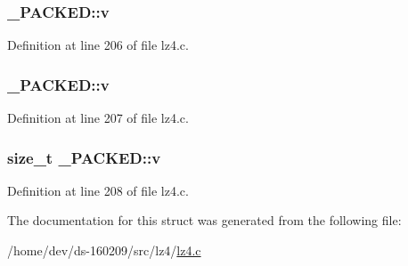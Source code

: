 \subsubsection[{v}]{ \+\_\+\+P\+A\+C\+K\+E\+D\+::v}\label{struct___p_a_c_k_e_d_a69e58b59c453f4a16003e7d1bd2c8f0e}


Definition at line 206 of file lz4.\+c.

\hypertarget{struct___p_a_c_k_e_d_ae9f6a01fd931fabac1d9997e5f6441bd}{}
\subsubsection[{v}]{ \+\_\+\+P\+A\+C\+K\+E\+D\+::v}\label{struct___p_a_c_k_e_d_ae9f6a01fd931fabac1d9997e5f6441bd}


Definition at line 207 of file lz4.\+c.

\hypertarget{struct___p_a_c_k_e_d_a11e423872a08ba480796b2518e74867c}{}
\subsubsection[{v}]{\setlength{\rightskip}{0pt plus 5cm}size\+\_\+t \+\_\+\+P\+A\+C\+K\+E\+D\+::v}\label{struct___p_a_c_k_e_d_a11e423872a08ba480796b2518e74867c}


Definition at line 208 of file lz4.\+c.



The documentation for this struct was generated from the following file\+:\begin{DoxyCompactItemize}
\item 
/home/dev/ds-\/160209/src/lz4/\hyperlink{lz4_8c}{lz4.\+c}\end{DoxyCompactItemize}
